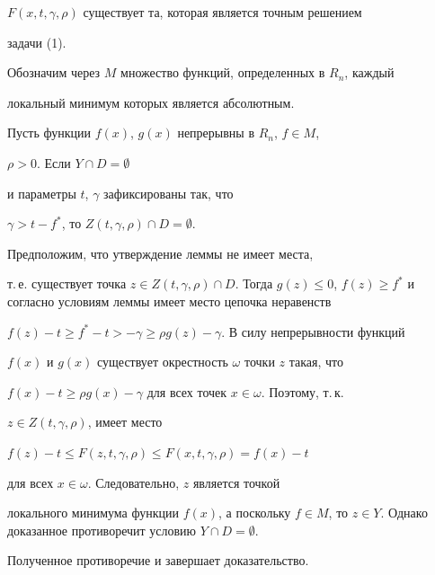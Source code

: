 $F(x,t,\gamma,\rho)$ существует та, которая является точным решением


задачи (1).





Обозначим через $M$ множество функций, определенных в $R_n$, каждый


локальный минимум которых является абсолютным.





\begin{lem}


Пусть функции $f(x)$, $g(x)$ непрерывны в $R_n$, $f\in M$,


$\rho>0$. Если $Y\cap D=\emptyset$


и параметры $t$, $\gamma$ зафиксированы так, что


$\gamma>t-f^*$, то $Z(t,\gamma,\rho)\cap


D=\emptyset$.


\end{lem}





\begin{pf}


Предположим, что утверждение леммы не имеет места,


т.\,е. существует точка $z\in Z(t,\gamma,\rho)\cap D$. Тогда $g(z)\le


0$, $f(z)\ge f^*$ и согласно условиям леммы имеет место цепочка неравенств 


$f(z)-t\ge f^*-t>-\gamma\ge \rho g(z)-\gamma$. В силу непрерывности функций 


$f(x)$ и $g(x)$ существует окрестность $\omega$ точки $z$ такая, что 


$f(x)-t\ge \rho g(x)-\gamma$ для всех точек $x\in\omega$. Поэтому, т.\,к.


$z\in Z(t,\gamma,\rho)$, имеет место 


$f(z)-t\le F(z,t,\gamma,\rho)\le F(x,t,\gamma,\rho)=f(x)-t$


для всех $x\in \omega$. Следовательно, $z$ является точкой


локального минимума функции $f(x)$, а поскольку $f\in M$, то $z\in


Y$. Однако доказанное противоречит условию $Y\cap D=\emptyset$.


Полученное противоречие и завершает доказательство.


\end{pf}





